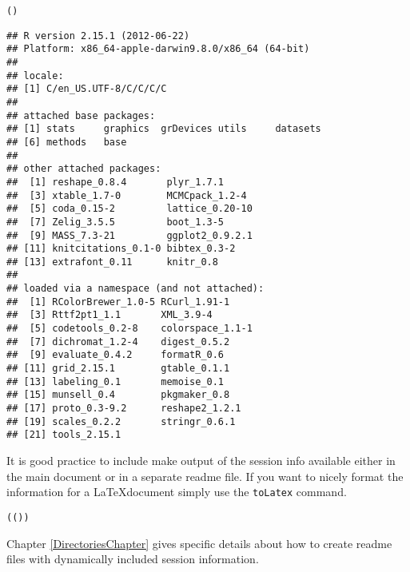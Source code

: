 \begin{knitrout}
\color{fgcolor}\begin{kframe}
\begin{alltt}
()
\end{alltt}
\begin{verbatim}
## R version 2.15.1 (2012-06-22)
## Platform: x86_64-apple-darwin9.8.0/x86_64 (64-bit)
## 
## locale:
## [1] C/en_US.UTF-8/C/C/C/C
## 
## attached base packages:
## [1] stats     graphics  grDevices utils     datasets 
## [6] methods   base     
## 
## other attached packages:
##  [1] reshape_0.8.4       plyr_1.7.1         
##  [3] xtable_1.7-0        MCMCpack_1.2-4     
##  [5] coda_0.15-2         lattice_0.20-10    
##  [7] Zelig_3.5.5         boot_1.3-5         
##  [9] MASS_7.3-21         ggplot2_0.9.2.1    
## [11] knitcitations_0.1-0 bibtex_0.3-2       
## [13] extrafont_0.11      knitr_0.8          
## 
## loaded via a namespace (and not attached):
##  [1] RColorBrewer_1.0-5 RCurl_1.91-1      
##  [3] Rttf2pt1_1.1       XML_3.9-4         
##  [5] codetools_0.2-8    colorspace_1.1-1  
##  [7] dichromat_1.2-4    digest_0.5.2      
##  [9] evaluate_0.4.2     formatR_0.6       
## [11] grid_2.15.1        gtable_0.1.1      
## [13] labeling_0.1       memoise_0.1       
## [15] munsell_0.4        pkgmaker_0.8      
## [17] proto_0.3-9.2      reshape2_1.2.1    
## [19] scales_0.2.2       stringr_0.6.1     
## [21] tools_2.15.1
\end{verbatim}
\end{kframe}
\end{knitrout}


\noindent It is good practice to include make output of the session info available either in the main document or in a separate readme file. If you want to nicely format the information for a \LaTeX document simply use the {\tt{toLatex}} command.

\begin{knitrout}
\color{fgcolor}\begin{kframe}
\begin{alltt}
(())
\end{alltt}
\end{kframe}
\end{knitrout}


\noindent Chapter \ref{DirectoriesChapter} gives specific details about how to create readme files with dynamically included session information.

